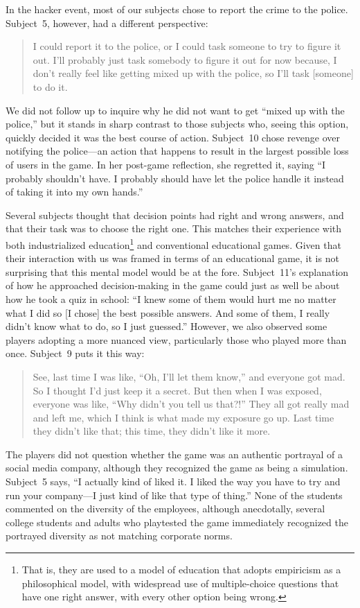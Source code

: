 \documentclass[letterpaper]{article}
\begin{document}
In the hacker event, most of our subjects chose to report the
crime to the police. Subject~5, however, had a different
perspective: 
\begin{quote}
I could report it to the police, or I could task someone to try to
figure it out. I'll probably just task somebody to figure it out for now
because, I don't really feel like getting mixed up with the police,
so I'll task [someone] to do it.
\end{quote}
We did not follow up to inquire why he did not want to get ``mixed up
with the police,'' but it stands in sharp contrast to those subjects
who, seeing this option, quickly decided it was the best course of
action.  Subject~10 chose revenge over notifying the police---an
action that happens to result in the largest possible loss of users in
the game. In her post-game reflection, she regretted it, saying ``I
probably shouldn't have. I probably should have let the police handle
it instead of taking it into my own hands.''

Several subjects thought that decision points had right and wrong
answers, and that their task was to choose the right one.
This matches their experience with both industrialized education\footnote{That is, they are used to a model of education that adopts empiricism as
a philosophical model, with widespread use of multiple-choice 
questions that have one right answer, with every other option being wrong.}
and conventional
educational games. Given that their interaction with us was framed in terms
of an educational game, it is not surprising that this mental model
would be at the fore.
Subject~11's explanation of how he approached decision-making in the
game could just as well be about how he took a quiz in school:
``I knew some of them would hurt me no matter what I did so [I chose] the
best possible answers. And some of them, I really didn't know what to do,
so I just guessed.''
However, we also observed some players adopting a more nuanced view,
particularly those who played more than once. 
Subject~9 puts it this way:
\begin{quote}
See, last time I was like, ``Oh, I'll let them know,'' and everyone
got mad. So I thought I'd just keep it a secret.
But then when I was exposed, everyone was like,
 ``Why didn't you tell us that?!''
They all got really mad and left me, which I think is what made my exposure
go up. Last time they didn't like that; this time, they didn't like it more.
\end{quote}

The players did not question whether the game was an authentic
portrayal of a social media company, although they recognized
the game as being a simulation.
Subject~5 says, ``I actually kind of liked it. I liked the way you have to try and run your company---I just kind of like that type of thing.''
None of the students commented on the diversity of the employees,
although anecdotally, several college students and 
adults who playtested the game
immediately recognized the portrayed diversity as not matching corporate
norms.
\end{document}
